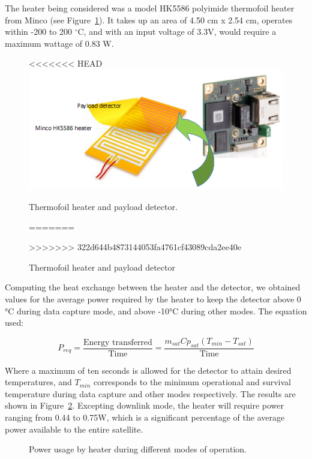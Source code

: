 \documentclass[12pt]{article}
\begin{document}
The heater being considered was a model HK5586 polyimide thermofoil heater from Minco (see Figure~\ref{fig:thermal-heater}). It takes up an area of 4.50 cm x 2.54 cm, operates within -200 to 200 $^\circ$C, and with an input voltage of 3.3V, would require a maximum wattage of 0.83 W. 

\begin{figure}[ht]%
\centering
<<<<<<< HEAD
\includegraphics{images/thermal-heater}%
\caption{Thermofoil heater and payload detector.}%
=======
\caption{Thermofoil heater and payload detector}%
>>>>>>> 322d644b4873144053fa4761cf43089cda2ee40e
\label{fig:thermal-heater}%
\end{figure}

Computing the heat exchange between the heater and the detector, we obtained values for the average power required by the heater to keep the detector above 0 °C during data capture mode, and above -10°C during other modes. The equation used:

\begin{equation}
P_{req} = \frac{\text{Energy transferred}}{\text{Time}} = \frac{m_{sat} Cp_{sat} (T_{min} - T_{sat})}{\text{Time}}
\label{eq:thermal-power-required}
\end{equation}

Where a maximum of ten seconds is allowed for the detector to attain desired temperatures, and $T_{min}$ corresponds to the minimum operational and survival temperature during data capture and other modes respectively. The results are shown in Figure~\ref{fig:thermal-power-usage}. Excepting downlink mode, the heater will require power ranging from 0.44 to 0.75W, which is a significant percentage of the average power available to the entire satellite.

\begin{figure}[ht]%
\centering
\caption{Power usage by heater during different modes of operation.}%
\label{fig:thermal-power-usage}%
\end{figure}
\end{document}
